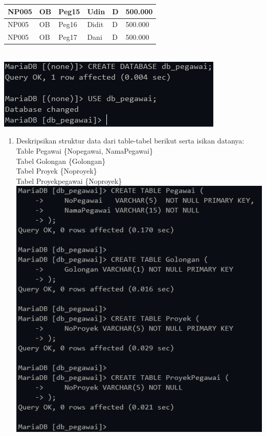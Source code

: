 \documentclass[12pt,titlepage]{article}
\begin{document}
\begin{enumerate}
{\begin{tabular}{|l|l|l|l|l|l|}
            \hline
            NP005 & OB & Peg15 & Udin & D & 500.000 \\
            \hline
            NP005 & OB & Peg16 & Didit & D & 500.000 \\
            \hline
            NP005 & OB & Peg17 & Dani & D & 500.000 \\
            \hline
        \end{tabular}
    }\\ 
    \includegraphics[width=.9\textwidth]{images/figures/tugas-2_preamble.PNG}
    \begin{enumerate}
        \item Deskripsikan struktur data dari table-tabel berikut serta isikan datanya: \\
        Table Pegawai \{Nopegawai, NamaPegawai\} \\
        Tabel Golongan \{Golongan\} \\
        Tabel Proyek \{Noproyek\} \\
        Tabel Proyekpegawai \{Noproyek\} \\
        \includegraphics[width=.85\textwidth]{images/figures/tugas-2_a_1.png} \\

\end{enumerate}
\end{enumerate}
\end{document}

